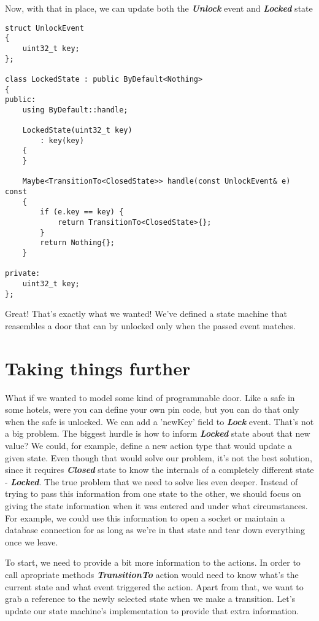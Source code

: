 \documentclass{article}[8pt]
\newcommand{\code}[1]{\textbf{\textit{#1}}}
\newcommand{\closed}{\code{Closed}}
\newcommand{\locked}{\code{Locked}}
\newcommand{\lock}{\code{Lock}}
\newcommand{\unlock}{\code{Unlock}}
\begin{document}
Now, with that in place, we can update both the \unlock{} event and \locked{} state

\bigskip
\begin{verbatim}
struct UnlockEvent
{
	uint32_t key;
};

class LockedState : public ByDefault<Nothing>
{
public:
	using ByDefault::handle;

	LockedState(uint32_t key)
		: key(key)
	{
	}

	Maybe<TransitionTo<ClosedState>> handle(const UnlockEvent& e) const
    {
        if (e.key == key) {
            return TransitionTo<ClosedState>{};
        }
        return Nothing{};
    }

private:
    uint32_t key;
};
\end{verbatim}
\bigskip

Great! That's exactly what we wanted! We've defined a state machine that reasembles a door that can by unlocked only when the passed event matches.

\section*{Taking things further}

What if we wanted to model some kind of programmable door. Like a safe in some hotels, were you can define your own pin code, but you can do that only when the safe is unlocked. We can add a 'newKey' field to \lock{} event. That's not a big problem. The biggest hurdle is how to inform \locked{} state about that new value? We could, for example, define a new action type that would update a given state. Even though that would solve our problem, it's not the best solution, since it requires \closed{} state to know the internals of a completely different state - \locked{}. The true problem that we need to solve lies even deeper. Instead of trying to pass this information from one state to the other, we should focus on giving the state information when it was entered and under what circumstances. For example, we could use this information to open a socket or maintain a database connection for as long as we're in that state and tear down everything once we leave.

To start, we need to provide a bit more information to the actions. In order to call apropriate methods \code{TransitionTo} action would need to know what's the current state and what event triggered the action. Apart from that, we want to grab a reference to the newly selected state when we make a transition. Let's update our state machine's implementation to provide that extra information.
\end{document}
